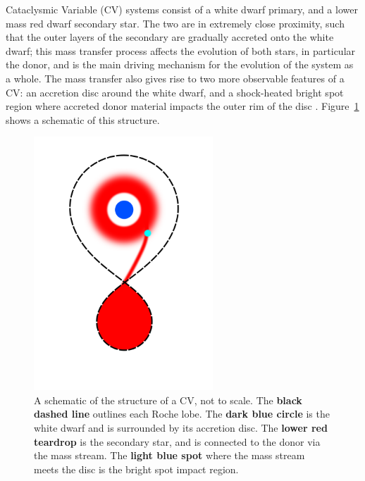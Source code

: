 \label{chpt:introduction} %

Cataclysmic Variable (CV) systems consist of a white dwarf primary, and a lower mass red dwarf secondary star. The two are in extremely close proximity, such that the outer layers of the secondary are gradually accreted onto the white dwarf; this mass transfer process affects the evolution of both stars, in particular the donor, and is the main driving mechanism for the evolution of the system as a whole.
The mass transfer also gives rise to two more observable features of a CV: an accretion disc around the white dwarf, and a shock-heated bright spot region where accreted donor material impacts the outer rim of the disc \citep{warner1995,hellier2001}. Figure~\ref{fig:introduction:CV schematic} shows a schematic of this structure.
\begin{figure}
    \centering
    \includegraphics[width=0.6\textwidth]{figures/introduction/CV_schematic.png}
    \caption{A schematic of the structure of a CV, not to scale. The {\bf black dashed line} outlines each Roche lobe. The {\bf dark blue circle} is the white dwarf and is surrounded by its accretion disc. The {\bf lower red teardrop} is the secondary star, and is connected to the donor via the mass stream. The {\bf light blue spot} where the mass stream meets the disc is the bright spot impact region.}
    \label{fig:introduction:CV schematic}
\end{figure}

